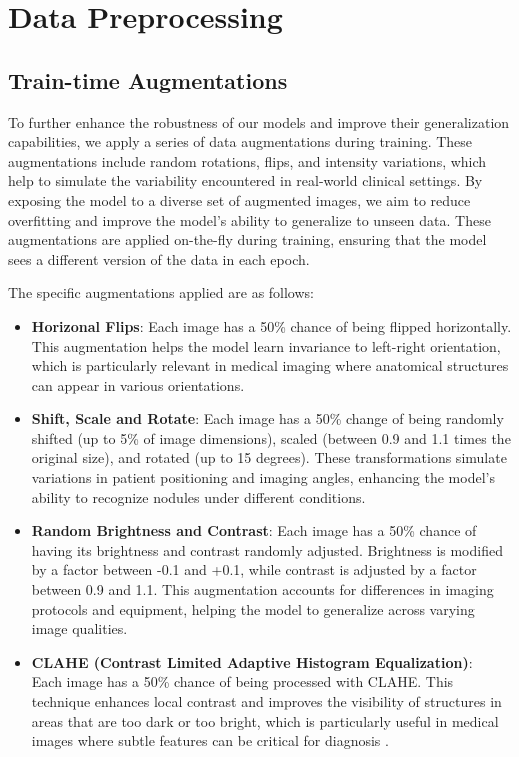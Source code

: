 \section{Data Preprocessing}

\subsection{Train-time Augmentations}
\label{sec:augmentation}
To further enhance the robustness of our models and improve their generalization capabilities, we apply a series of data augmentations during training. These augmentations include random rotations, flips, and intensity variations, which help to simulate the variability encountered in real-world clinical settings. By exposing the model to a diverse set of augmented images, we aim to reduce overfitting and improve the model's ability to generalize to unseen data. These augmentations are applied on-the-fly during training, ensuring that the model sees a different version of the data in each epoch.

The specific augmentations applied are as follows:
\begin{itemize}
    \item \textbf{Horizonal Flips}: Each image has a 50\% chance of being flipped horizontally. This augmentation helps the model learn invariance to left-right orientation, which is particularly relevant in medical imaging where anatomical structures can appear in various orientations.
    \item \textbf{Shift, Scale and Rotate}: Each image has a 50\% change of being randomly shifted (up to 5\% of image dimensions), scaled (between 0.9 and 1.1 times the original size), and rotated (up to 15 degrees). These transformations simulate variations in patient positioning and imaging angles, enhancing the model's ability to recognize nodules under different conditions.
    \item \textbf{Random Brightness and Contrast}: Each image has a 50\% chance of having its brightness and contrast randomly adjusted. Brightness is modified by a factor between -0.1 and +0.1, while contrast is adjusted by a factor between 0.9 and 1.1. This augmentation accounts for differences in imaging protocols and equipment, helping the model to generalize across varying image qualities.
    \item \textbf{CLAHE (Contrast Limited Adaptive Histogram Equalization)}: \\Each image has a 50\% chance of being processed with CLAHE. This technique enhances local contrast and improves the visibility of structures in areas that are too dark or too bright, which is particularly useful in medical images where subtle features can be critical for diagnosis \cite{mishra2021clahe}.
\end{itemize}


